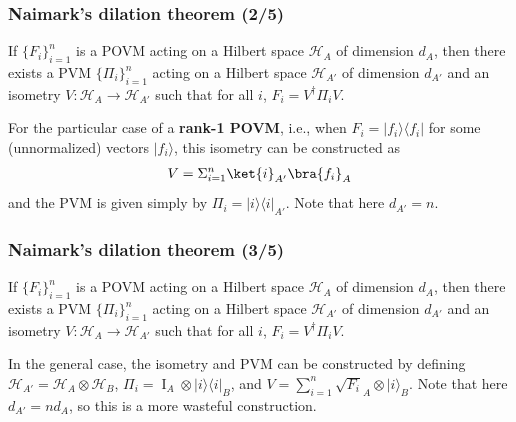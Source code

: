 \documentclass{beamer}
\begin{document}
\begin{frame}
    \frametitle{Naimark's dilation theorem (2/5)}
    \begin{theorem}
        If ${\displaystyle \{F_{i}\}_{i=1}^{n}}$ is a POVM acting on a Hilbert space
        ${\displaystyle {\mathcal {H}}_{A}}$ of dimension
        ${\displaystyle d_{A}}$, then there exists a PVM
        ${\displaystyle \{\Pi _{i}\}_{i=1}^{n}}$ acting on a Hilbert space
        ${\displaystyle {\mathcal {H}}_{A'}}$ of dimension
        ${\displaystyle d_{A'}}$ and an isometry
        ${\displaystyle V:{\mathcal {H}}_{A}\to {\mathcal {H}}_{A'}}$ such that for all $i$,
        ${\displaystyle F_{i}=V^{\dagger }\Pi _{i}V.}$
    \end{theorem}
    For the particular case of a \textbf{rank-1 POVM}, i.e., when
    ${\displaystyle F_{i}=|f_{i}\rangle \langle f_{i}|}$ for some (unnormalized) vectors
    ${\displaystyle |f_{i}\rangle }$, this isometry can be constructed as
    \begin{align}
        V = \Sigma_{i=1}^{n} \ket{i}_{A'}\bra{f_{i}}_{A}
    \end{align}
    and the PVM is given simply by
    ${\displaystyle \Pi _{i}=|i\rangle \langle i|_{A'}}$. Note that here
    ${\displaystyle d_{A'}=n}$.
\end{frame}

\begin{frame}
    \frametitle{Naimark's dilation theorem (3/5)}
    \begin{theorem}
        If ${\displaystyle \{F_{i}\}_{i=1}^{n}}$ is a POVM acting on a Hilbert space
        ${\displaystyle {\mathcal {H}}_{A}}$ of dimension
        ${\displaystyle d_{A}}$, then there exists a PVM
        ${\displaystyle \{\Pi _{i}\}_{i=1}^{n}}$ acting on a Hilbert space
        ${\displaystyle {\mathcal {H}}_{A'}}$ of dimension
        ${\displaystyle d_{A'}}$ and an isometry
        ${\displaystyle V:{\mathcal {H}}_{A}\to {\mathcal {H}}_{A'}}$ such that for all $i$,
        ${\displaystyle F_{i}=V^{\dagger }\Pi _{i}V.}$
    \end{theorem}
    In the general case, the isometry and PVM can be constructed by defining
    ${\displaystyle {\mathcal {H}}_{A'}={\mathcal {H}}_{A}\otimes {\mathcal {H}}_{B}}$,
    ${\displaystyle \Pi _{i}=\operatorname {I} _{A}\otimes |i\rangle \langle i|_{B}}$, and
    ${\displaystyle V=\sum _{i=1}^{n}{\sqrt {F_{i}}}_{A}\otimes {|i\rangle }_{B}.}$
    Note that here
    ${\displaystyle d_{A'}=nd_{A}}$, so this is a more wasteful construction.
\end{frame}
\end{document}

